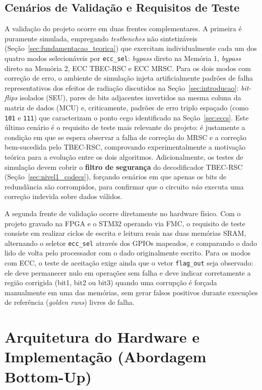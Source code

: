 \documentclass[12pt,a4paper]{article}
\begin{document}
\subsection{Cenários de Validação e Requisitos de Teste}

A validação do projeto ocorre em duas frentes complementares. A primeira é 
puramente simulada, empregando \textit{testbenches} não sintetizáveis 
(Seção~\ref{sec:fundamentacao_teorica}) que exercitam individualmente cada 
um dos quatro modos selecionáveis por \texttt{ecc\_sel}: \textit{bypass} 
direto na Memória 1, \textit{bypass} direto na Memória 2, ECC TBEC-RSC e 
ECC MRSC. Para os dois modos com correção de erro, o ambiente de simulação 
injeta artificialmente padrões de falha representativos dos efeitos de 
radiação discutidos na Seção~\ref{sec:introducao}: \textit{bit-flips} 
isolados (SEU), pares de bits adjacentes invertidos na mesma coluna da 
matriz de dados (MCU) e, criticamente, padrões de erro triplo espaçado 
(como \texttt{101} e \texttt{111}) que caracterizam o ponto cego 
identificado na Seção~\ref{sec:eccs}. Este último cenário é o requisito de 
teste mais relevante do projeto: é justamente a condição em que se espera 
observar a falha de correção do MRSC e a correção bem-sucedida pelo 
TBEC-RSC, comprovando experimentalmente a motivação teórica para a 
evolução entre os dois algoritmos. Adicionalmente, os testes de simulação 
devem cobrir o \textbf{filtro de segurança} do decodificador TBEC-RSC 
(Seção~\ref{sec:nivel1_codecs}), forçando cenários em que apenas os bits de 
redundância são corrompidos, para confirmar que o circuito \emph{não} 
executa uma correção indevida sobre dados válidos.

A segunda frente de validação ocorre diretamente no hardware físico. Com o 
projeto gravado na FPGA e o STM32 operando via FMC, o requisito de teste 
consiste em realizar ciclos de escrita e leitura reais nas duas memórias 
SRAM, alternando o seletor \texttt{ecc\_sel} através dos GPIOs mapeados, e 
comparando o dado lido de volta pelo processador com o dado originalmente 
escrito. Para os modos com ECC, o teste de aceitação exige ainda que o 
vetor \texttt{flag\_out} seja observado: ele deve permanecer nulo em 
operações sem falha e deve indicar corretamente a região corrigida (bit1, 
bit2 ou bit3) quando uma corrupção é forçada manualmente em uma das 
memórias, sem gerar falsos positivos durante execuções de referência 
(\textit{golden runs}) livres de falha.

\section{Arquitetura do Hardware e Implementação (Abordagem Bottom-Up)}
\label{sec:arquitetura_hardware}
\end{document}
